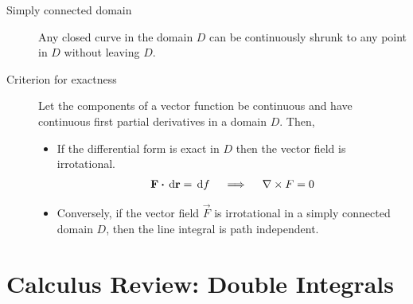 \begin{description}
    \item[Simply connected domain] Any closed curve in the domain $ D $ can be
        continuously shrunk to any point in $ D $ without leaving $ D $.

    \item[Criterion for exactness] Let the components of a vector function be continuous
        and have continuous first partial derivatives  in a domain $ D $. Then,

        \begin{itemize}
            \item If the differential form is exact in $ D $ then the vector field is
                  irrotational.
                  \begin{align}
                      \vec{F} \dotp \dl{\vec{r}} = \dl f \quad \implies
                      \quad  \nabla \times F = 0
                  \end{align}

            \item Conversely, if the vector field $ \vec{F} $ is irrotational in a
                  simply connected domain $ D $, then the line integral is path
                  independent.
        \end{itemize}
\end{description}

\section{Calculus Review: Double Integrals}

